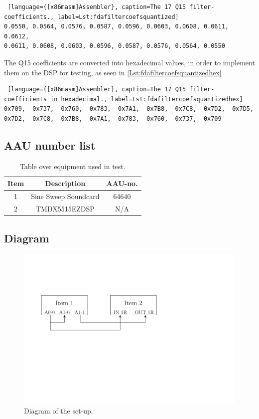 \begin{lstlisting} [language={[x86masm]Assembler}, caption=The 17 Q15 filter-coefficients., label=Lst:fdafiltercoefsquantized]
0.0550,	0.0564,	0.0576,	0.0587,	0.0596,	0.0603,	0.0608,	0.0611,	0.0612,
0.0611,	0.0608,	0.0603,	0.0596,	0.0587,	0.0576,	0.0564,	0.0550
\end{lstlisting}

The Q15 coefficients are converted into hexadecimal values, in order to implement them on the DSP for testing, as seen in \autoref{Lst:fdafiltercoefsquantizedhex} 

\begin{lstlisting} [language={[x86masm]Assembler}, caption=The 17 Q15 filter-coefficients in hexadecimal., label=Lst:fdafiltercoefsquantizedhex]
0x709,	0x737,	0x760,	0x783,	0x7A1,	0x7B8,	0x7C8,	0x7D2,	0x7D5,
0x7D2,	0x7C8,	0x7B8,	0x7A1,	0x783,	0x760,	0x737,	0x709
\end{lstlisting}


\subsection{AAU number list}
\begin{table}[H]
	\centering
	\begin{tabular}{ c c c } \toprule
		{Item}	& {Description} & {AAU-no}. \\ \bottomrule 
		1	&	Sine Sweep Soundcard	& 64640		\\
		2	&	TMDX5515EZDSP	&	N/A		\\ 
		\bottomrule
	\end{tabular}
	\caption{Table over equipment used in test.}
	\label{tab:UsedEquipmentListningFIRTest}
\end{table}

\subsection{Diagram}
\begin{figure}[H]
	\centering
	\includegraphics{../Journal/Experiments/Figures/FIRFilterTestSetup}
	\caption{Diagram of the set-up.}
	\label{Fig:FIRSetupDiagram}
\end{figure}



